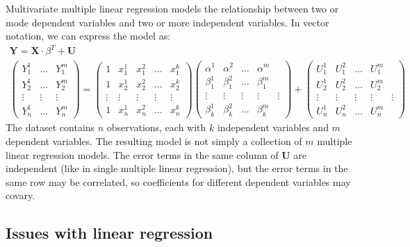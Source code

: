 Multivariate multiple linear regression models the relationship between two or mode dependent variables and two or more independent variables. In vector notation, we can express the model as:
\begin{gather*}
    \mathbf{Y} = \mathbf{X} \cdot \beta^T + \mathbf{U} \\
    \begin{pmatrix}
        Y_1^1 & \dots & Y_1^m \\
        Y_2^1 & \dots & Y_2^m \\
        \vdots & \vdots & \vdots \\
        Y_n^1 & \dots & Y_n^m
    \end{pmatrix} =
    \begin{pmatrix}
        1 & x_1^1 & x_1^2 & \dots & x_1^k \\
        1 & x_2^1 & x_2^2 & \dots & x_2^k \\
        \vdots & \vdots & \vdots & \vdots & \vdots \\
        1 & x_n^1 & x_n^2 & \dots & x_n^k
    \end{pmatrix}
    \begin{pmatrix}
        \alpha^1 & \alpha^2 & \dots & \alpha^m \\
        \beta_1^1 & \beta_1^2 & \dots & \beta_1^m \\
        \vdots & \vdots & \vdots & \vdots & \vdots \\
        \beta_k^1 & \beta_k^2 & \dots & \beta_k^m
    \end{pmatrix} +
    \begin{pmatrix}
        U_1^1 & U_1^2 & \dots & U_1^m \\
        U_2^1 & U_2^2 & \dots & U_2^m \\
        \vdots & \vdots & \vdots & \vdots & \vdots \\
        U_n^1 & U_n^2 & \dots & U_n^m
    \end{pmatrix}
\end{gather*}
The dataset contains $n$ observations, each with $k$ independent variables and $m$ dependent variables. The resulting model is not simply a collection of $m$ multiple linear regression models. The error terms in the same column of $\mathbf{U}$ are independent (like in single multiple linear regression), but the error terms in the same row may be correlated, so coefficients for different dependent variables may covary.

\subsection{Issues with linear regression}